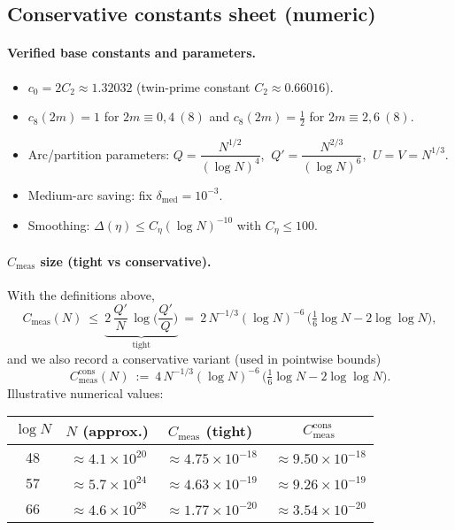 \documentclass[11pt]{article}
\theoremstyle{definition}
\theoremstyle{remark}
\begin{document}
\subsection*{Conservative constants sheet (numeric)}
\paragraph{Verified base constants and parameters.}
\begin{itemize}
  \item $c_0=2C_2\approx 1.32032$ (twin-prime constant $C_2\approx 0.66016$).
  \item $c_8(2m)=1$ for $2m\equiv 0,4\ (8)$ and $c_8(2m)=\tfrac12$ for $2m\equiv 2,6\ (8)$.
  \item Arc/partition parameters: $Q=\dfrac{N^{1/2}}{(\log N)^4}$, $\ Q'=\dfrac{N^{2/3}}{(\log N)^6}$, $\ U=V=N^{1/3}$.
  \item Medium-arc saving: fix $\delta_{\mathrm{med}}=10^{-3}$.
  \item Smoothing: $\Delta(\eta)\le C_{\eta}(\log N)^{-10}$ with $C_{\eta}\le 100$.
\end{itemize}

\paragraph{$C_{\mathrm{meas}}$ size (tight vs conservative).}
With the definitions above,
\[
  C_{\mathrm{meas}}(N)\ \le\ \underbrace{2\,\frac{Q'}{N}\,\log\!\Big(\frac{Q'}{Q}\Big)}_{\text{tight}}\ =\ 2\,N^{-1/3}(\log N)^{-6}\,\Big(\tfrac16\log N-2\log\log N\Big),
\]
and we also record a conservative variant (used in pointwise bounds)
\[
  C_{\mathrm{meas}}^{\text{cons}}(N)\ :=\ 4\,N^{-1/3}(\log N)^{-6}\,\Big(\tfrac16\log N-2\log\log N\Big).
\]
Illustrative numerical values:
\begin{center}
\begin{tabular}{c|c|c|c}
$\log N$ & $N$ (approx.) & $C_{\mathrm{meas}}$ (tight) & $C_{\mathrm{meas}}^{\text{cons}}$ \\
\hline
48 & $\,\approx 4.1\times 10^{20}$ & $\,\approx 4.75\times 10^{-18}$ & $\,\approx 9.50\times 10^{-18}$ \\
57 & $\,\approx 5.7\times 10^{24}$ & $\,\approx 4.63\times 10^{-19}$ & $\,\approx 9.26\times 10^{-19}$ \\
66 & $\,\approx 4.6\times 10^{28}$ & $\,\approx 1.77\times 10^{-20}$ & $\,\approx 3.54\times 10^{-20}$ \\
\end{tabular}
\end{center}
\end{document}
